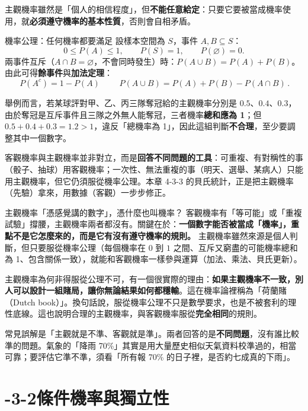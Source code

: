 \documentclass[11pt]{article}
\begin{document}
主觀機率雖然是「個人的相信程度」，但\textbf{不能任意給定}：只要它要被當成機率使用，就\textbf{必須遵守機率的基本性質}，否則會自相矛盾。

\begin{補充框}{機率公理：任何機率都要滿足}
設樣本空間為 $S$，事件 $A,B\subseteq S$：
$$0\le P(A)\le 1,\qquad P(S)=1,\qquad P(\varnothing)=0.$$
兩事件互斥（$A\cap B=\varnothing$，不會同時發生）時：$P(A\cup B)=P(A)+P(B)$。由此可得\textbf{餘事件}與\textbf{加法定理}：
$$\boxed{\,P(A^c)=1-P(A)\,}\qquad \boxed{\,P(A\cup B)=P(A)+P(B)-P(A\cap B)\,}.$$
\end{補充框}

舉例而言，若某球評對甲、乙、丙三隊奪冠給的主觀機率分別是 $0.5$、$0.4$、$0.3$，由於奪冠是互斥事件且三隊之外無人能奪冠，三者機率\textbf{總和應為 1}；但 $0.5+0.4+0.3=1.2>1$，違反「總機率為 1」，因此這組判斷\textbf{不合理}，至少要調整其中一個數字。

客觀機率與主觀機率並非對立，而是\textbf{回答不同問題的工具}：可重複、有對稱性的事（骰子、抽球）用客觀機率；一次性、無法重複的事（明天、選舉、某病人）只能用主觀機率，但它仍須服從機率公理。本章 4-3-3 的貝氏統計，正是把主觀機率（先驗）拿來，用數據（客觀）一步步修正。

\begin{延伸框}{主觀機率「憑感覺講的數字」，憑什麼也叫機率？}
客觀機率有「等可能」或「重複試驗」撐腰，主觀機率兩者都沒有。關鍵在於：\textbf{一個數字能否被當成「機率」，重點不是它怎麼來的，而是它有沒有遵守機率的規則。} 主觀機率雖然來源是個人判斷，但只要服從機率公理（每個機率在 $0$ 到 $1$ 之間、互斥又窮盡的可能機率總和為 1、包含關係一致），就能和客觀機率一樣參與運算（加法、乘法、貝氏更新）。

主觀機率為何非得服從公理不可，有一個很實際的理由：\textbf{如果主觀機率不一致，別人可以設計一組賭局，讓你無論結果如何都穩輸}。這在機率論裡稱為「荷蘭賭（Dutch book）」。換句話說，服從機率公理不只是數學要求，也是不被套利的理性底線。這也說明合理的主觀機率，與客觀機率服從\textbf{完全相同}的規則。

常見誤解是「主觀就是不準、客觀就是準」。兩者回答的是\textbf{不同問題}，沒有誰比較準的問題。氣象的「降雨 70\%」其實是用大量歷史相似天氣資料校準過的，相當可靠；要評估它準不準，須看「所有報 70\% 的日子裡，是否約七成真的下雨」。
\end{延伸框}

\section*{-3-2\quad 條件機率與獨立性}
\end{document}
